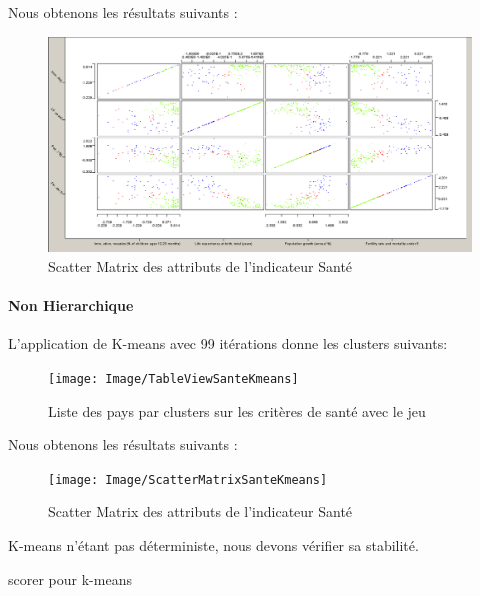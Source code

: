 Nous obtenons les résultats suivants : 

\begin{figure}[H]
	\begin{center}
		\includegraphics[scale=0.5]{Image/ScatterMatrixSanteNoMissing2}
		\caption{Scatter Matrix des attributs de l'indicateur Santé \jeuc}
	\end{center}
\end{figure}


\paragraph{Non Hierarchique}
L'application de K-means avec 99 itérations donne les clusters suivants: 

\begin{figure}[H]
	\begin{center}
		\texttt{[image: Image/TableViewSanteKmeans]}
		\caption{Liste des pays par clusters sur les critères de santé avec le jeu \jeuc}
	\end{center}
\end{figure}


Nous obtenons les résultats suivants : 

\begin{figure}[H]
	\begin{center}
		\texttt{[image: Image/ScatterMatrixSanteKmeans]}
		\caption{Scatter Matrix des attributs de l'indicateur Santé \jeuc}
	\end{center}
\end{figure}

K-means n'étant pas déterministe, nous devons vérifier sa stabilité.

\begin{Huge} 
scorer pour k-means 
\end{Huge}

